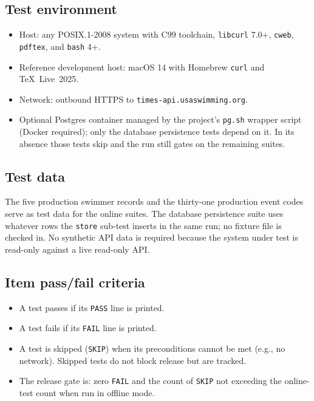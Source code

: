 \documentclass[12pt]{article}
\newcommand{\code}[1]{\texttt{#1}}
\begin{document}
\subsection{Test environment}

\begin{itemize}
  \item Host: any POSIX.1-2008 system with C99 toolchain,
        \code{libcurl} 7.0+, \code{cweb}, \code{pdftex}, and
        \code{bash} 4+.
  \item Reference development host: macOS 14 with Homebrew
        \code{curl} and TeX~Live~2025.
  \item Network: outbound HTTPS to
        \texttt{times-api.usaswimming.org}.
  \item Optional Postgres container managed by the project's
        \texttt{pg.sh} wrapper script (Docker required); only
        the database persistence tests depend on it.  In its
        absence those tests skip and the run still gates on the
        remaining suites.
\end{itemize}

\subsection{Test data}

The five production swimmer records and the thirty-one
production event codes serve as test data for the online
suites.  The database persistence suite uses whatever rows the
\code{store} sub-test inserts in the same run; no fixture file
is checked in.  No synthetic API data is required because
the system under test is read-only against a live read-only API.

\subsection{Item pass/fail criteria}

\begin{itemize}
  \item A test passes if its \code{PASS} line is printed.
  \item A test fails if its \code{FAIL} line is printed.
  \item A test is skipped (\code{SKIP}) when its preconditions
        cannot be met (e.g., no network).  Skipped tests do not
        block release but are tracked.
  \item The release gate is: zero \code{FAIL} and the count of
        \code{SKIP} not exceeding the online-test count when run
        in offline mode.
\end{itemize}
\end{document}
